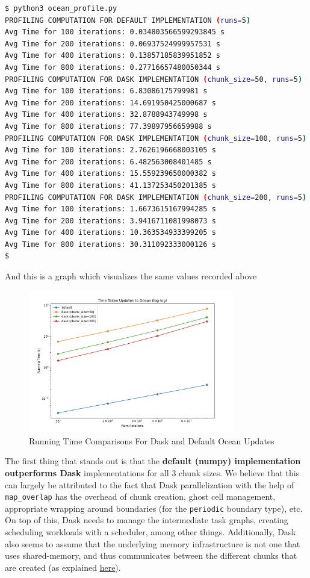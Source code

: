 \documentclass[a4paper,12pt]{article}
\begin{document}
\begin{lstlisting}[language=bash,basicstyle=\tiny\ttfamily]
$ python3 ocean_profile.py
PROFILING COMPUTATION FOR DEFAULT IMPLEMENTATION (runs=5)
Avg Time for 100 iterations: 0.034803566599293845 s 
Avg Time for 200 iterations: 0.06937524999957531 s 
Avg Time for 400 iterations: 0.13857185839951852 s 
Avg Time for 800 iterations: 0.27716657480050344 s 
PROFILING COMPUTATION FOR DASK IMPLEMENTATION (chunk_size=50, runs=5)
Avg Time for 100 iterations: 6.83086175799981 s 
Avg Time for 200 iterations: 14.691950425000687 s 
Avg Time for 400 iterations: 32.8788943749998 s 
Avg Time for 800 iterations: 77.39897956659988 s 
PROFILING COMPUTATION FOR DASK IMPLEMENTATION (chunk_size=100, runs=5)
Avg Time for 100 iterations: 2.7626196668003105 s 
Avg Time for 200 iterations: 6.482563008401485 s 
Avg Time for 400 iterations: 15.559239650000382 s 
Avg Time for 800 iterations: 41.137253450201385 s 
PROFILING COMPUTATION FOR DASK IMPLEMENTATION (chunk_size=200, runs=5)
Avg Time for 100 iterations: 1.6673615167994285 s 
Avg Time for 200 iterations: 3.9416711081998073 s 
Avg Time for 400 iterations: 10.363534933399205 s 
Avg Time for 800 iterations: 30.311092333000126 s 
$
\end{lstlisting}

And this is a graph which visualizes the same values recorded above

\begin{figure}[H]
  \centering
  \includegraphics[width=0.8\textwidth]{../images/bonus_default_dask_runtimes.png}
  \caption{Running Time Comparisons For Dask and Default Ocean Updates}
\end{figure}



The first thing that stands out is that the \textbf{default (numpy) implementation outperforms Dask} implementations for all 3 chunk sizes. We believe that this can largely be attributed to the fact that Dask parallelization with the help of \verb|map_overlap| has the overhead of chunk creation, ghost cell management, appropriate wrapping around boundaries (for the \verb|periodic| boundary type), etc. On top of this, Dask needs to manage the intermediate task graphs, creating scheduling workloads with a scheduler, among other things. Additionally, Dask also seems to assume that the underlying memory infrastructure is not one that uses shared-memory, and thus communicates between the different chunks that are created (as explained \href{https://canvas.kth.se/courses/52247/discussion_topics/452810}{here}). 
\end{document}
